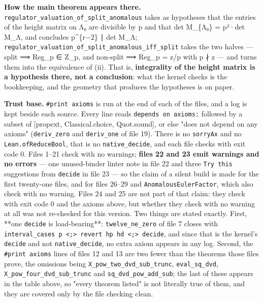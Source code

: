 \documentclass[11pt,a4paper]{article}
\theoremstyle{named}
\begin{document}
\textbf{How the main theorem appears there.} \texttt{regulator\_\allowbreak{}valuation\_\allowbreak{}of\_\allowbreak{}split\_\allowbreak{}anomalous} takes as hypotheses that the entries of the height matrix on Λ₀ are divisible by p and that det M\_\{Λ₀\} = p²·det M\_Λ, and concludes p\textasciicircum{}\{r−2\} ∣ det M\_Λ; \texttt{regulator\_\allowbreak{}valuation\_\allowbreak{}of\_\allowbreak{}split\_\allowbreak{}anomalous\_\allowbreak{}iff\_\allowbreak{}split} takes the two halves — split ⟹ Reg\_p ∈ Z\_p, and non-split ⟹ Reg\_p = z/p with p ∤ z — and turns them into the equivalence of (ii). That is, \textbf{integrality of the height matrix is a hypothesis there, not a conclusion}: what the kernel checks is the bookkeeping, and the geometry that produces the hypotheses is on paper.

\textbf{Trust base.} \texttt{\#print\ \allowbreak{}axioms} is run at the end of each of the files, and a log is kept beside each source. Every line reads \texttt{depends\ \allowbreak{}on\ \allowbreak{}axioms:} followed by a subset of [propext, Classical.choice, Quot.sound], or else "does not depend on any axioms" (\texttt{deriv\_\allowbreak{}zero} and \texttt{deriv\_\allowbreak{}one} of file 19). There is no \texttt{sorryAx} and no \texttt{Lean.\allowbreak{}ofReduceBool}, that is no \texttt{native\_\allowbreak{}decide}, and each file checks with exit code 0. Files 1–21 check with no warnings; \textbf{files 22 and 23 emit warnings and no errors} — one unused-binder linter note in file 22 and three \texttt{Try\ \allowbreak{}this} suggestions from \texttt{decide} in file 23 — so the claim of a silent build is made for the first twenty-one files, and for files 26–29 and \texttt{AnomalousEulerFactor}, which also check with no warning. Files 24 and 25 are not part of that claim: they check with exit code 0 and the axioms above, but whether they check with no warning at all was not re-checked for this version. Two things are stated exactly. First, **one \texttt{decide} is load-bearing**: \texttt{twelve\_\allowbreak{}ne\_\allowbreak{}zero} of file 7 closes with \texttt{interval\_\allowbreak{}cases\ \allowbreak{}p\ \allowbreak{}\textless{};\textgreater{}\ \allowbreak{}revert\ \allowbreak{}hp\ \allowbreak{}hd\ \allowbreak{}\textless{};\textgreater{}\ \allowbreak{}decide}, and since that is the kernel's \texttt{decide} and not \texttt{native\_\allowbreak{}decide}, no extra axiom appears in any log. Second, the \texttt{\#print\ \allowbreak{}axioms} lines of files 12 and 13 are two fewer than the theorems those files prove, the omissions being \texttt{X\_\allowbreak{}pow\_\allowbreak{}two\_\allowbreak{}dvd\_\allowbreak{}sub\_\allowbreak{}trunc}, \texttt{eval\_\allowbreak{}sq\_\allowbreak{}dvd}, \texttt{X\_\allowbreak{}pow\_\allowbreak{}four\_\allowbreak{}dvd\_\allowbreak{}sub\_\allowbreak{}trunc} and \texttt{sq\_\allowbreak{}dvd\_\allowbreak{}pow\_\allowbreak{}add\_\allowbreak{}sub}; the last of these appears in the table above, so "every theorem listed" is not literally true of them, and they are covered only by the file checking clean.
\end{document}
